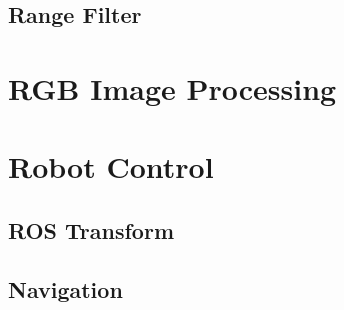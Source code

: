 


\subsection{Range Filter}



\section{RGB Image Processing}


\section{Robot Control}
\subsection{ROS Transform}
\subsection{Navigation}
